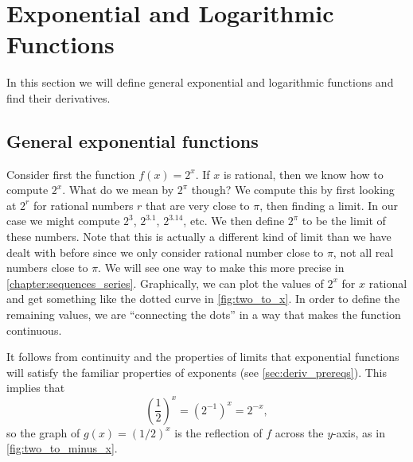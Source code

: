 \section{Exponential and Logarithmic Functions}\label{sec:exp_log}

In this section we will define general exponential and logarithmic functions and find their derivatives. 

\subsection{General exponential functions}

Consider first the function $f(x)=2^x$. If $x$ is rational, then we know how to compute $2^x$. What do we mean by $2^\pi$ though? We compute this by first looking at $2^r$ for rational numbers $r$ that are very close to $\pi$, then finding a limit. In our case we might compute $2^3$, $2^{3.1}$, $2^{3.14}$, etc. We then define $2^\pi$ to be the limit of these numbers. Note that this is actually a different kind of limit than we have dealt with before since we only consider rational number close to $\pi$, not all real numbers close to $\pi$. We will see one way to make this more precise in \autoref{chapter:sequences_series}. Graphically, we can plot the values of $2^x$ for $x$ rational and get something like the dotted curve in \autoref{fig:two_to_x}. In order to define the remaining values, we are ``connecting the dots'' in a way that makes the function continuous.

It follows from continuity and the properties of limits that exponential functions will satisfy the familiar properties of exponents (see \autoref{sec:deriv_prereqs}).  This implies that
\[\left(\frac12\right)^x =(2^{-1})^x=2^{-x},\]
so the graph of $g(x)=(1/2)^x$ is the reflection of $f$ across the $y$-axis, as in \autoref{fig:two_to_minus_x}.

